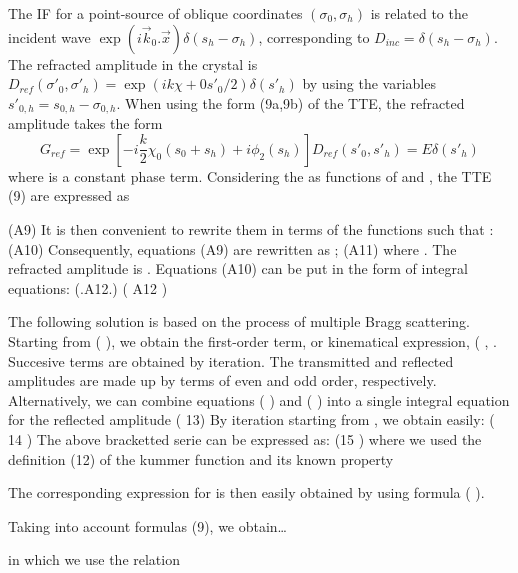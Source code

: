 \documentclass[preprint]{iucr}              %
\newcommand{\inblue}[1]{{\color{blue}#1}}
\begin{document}
\inblue{


The IF for a point-source of oblique coordinates $(\sigma_0,\sigma_h)$ is related to the incident wave $\exp(i\vec k_0 . \vec x) \delta(s_h-\sigma_h)$, corresponding to $D_{inc}=\delta(s_h-\sigma_h)$. The refracted amplitude in the crystal is $D_{ref}(\sigma'_0,\sigma'_h)=\exp(i k \chi+0 s'_0/2)\delta(s'_h)$ by using the variables $s'_{0,h}=s_{0,h}-\sigma_{0,h}$. When using the form (9a,9b) of the TTE, the refracted amplitude takes the form
\begin{equation}
    G_{ref}=\exp[-i\frac{k}{2}\chi_0(s_0+s_h)+i \phi_2(s_h)] D_{ref}(s'_0,s'_h) = E\delta(s'_h)
\end{equation}
where  is a constant phase term. Considering the   as functions    of   and  , the TTE (9) are expressed as
                        
                                     (A9)
It is then convenient to rewrite them in terms of the functions   such that 
                      :                
                               (A10)
Consequently, equations (A9) are rewritten as
                          ;                       (A11)
where  . The refracted amplitude is . Equations (A10) can be put in the form of integral equations:
                                (.A12.)
                            ( A12 )

The following solution is based on the process of multiple Bragg scattering. Starting from ( ), we obtain the first-order term, or kinematical expression, ( ,  . Succesive terms are obtained by iteration. The transmitted and reflected amplitudes are made up by terms of  even and odd order, respectively. Alternatively, we can combine equations (  ) and (  ) into a single integral equation for the reflected amplitude
                     (  13)
By iteration starting from  , we obtain easily:
      ( 14 )
The above bracketted serie can be expressed as:
        (15  )
where we used the definition (12) of the kummer function and its known property
                              
The corresponding expression for  is then easily obtained by using formula (  ).

Taking into account  formulas (9), we obtain…
     

in which we use  the relation      




}
\end{document}

